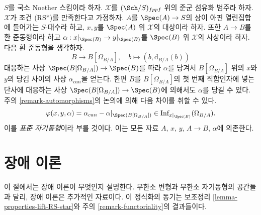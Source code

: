 \begin{remark}[표준 자기동형]
\label{remark-canonical-isomorphism}
$S$를 국소 Noether 스킴이라 하자. $\mathcal{X}$를
$(\Sch/S)_{fppf}$ 위의 준군 섬유화 범주라 하자.
$\mathcal{X}$가 조건 (RS*)를 만족한다고 가정하자.
$A$를 $\Spec(A) \to S$의 상이 아핀 열린집합에 들어가는 $S$-대수라
하고, $x, y$를 $\Spec(A)$ 위 $\mathcal{X}$의 대상이라 하자.
또한 $A \to B$를 환 준동형이라 하고
$\alpha : x|_{\Spec(B)} \to y|_{\Spec(B)}$를 $\Spec(B)$ 위 $\mathcal{X}$의
사상이라 하자. 다음 환 준동형을 생각하자.
$$
B \longrightarrow B[\Omega_{B/A}],
\quad
b \longmapsto (b, \text{d}_{B/A}(b))
$$
대응하는 사상 $\Spec(B[\Omega_{B/A}]) \to \Spec(B)$를 따라 $\alpha$를
당겨서 $B[\Omega_{B/A}]$ 위의 $x$와 $y$의 당김 사이의 사상
$\alpha_{can}$을 얻는다.
한편 $B$를 $B[\Omega_{B/A}]$의 첫 번째 직합인자에 넣는 단사에 대응하는
사상 $\Spec(B[\Omega_{B/A}]) \to \Spec(B)$에 의해서도 $\alpha$를 당길 수
있다. 주의 \ref{remark-automorphisms}의 논의에 의해 다음 차이를 취할 수 있다.
$$
\varphi(x, y, \alpha) = \alpha_{can} - \alpha|_{\Spec(B[\Omega_{B/A}])} \in
\text{Inf}_{x|_{\Spec(B)}}(\Omega_{B/A}).
$$
이를 {\it 표준 자기동형}이라 부를 것이다. 이는 모든 자료
$A$, $x$, $y$, $A \to B$, $\alpha$에 의존한다.
\end{remark}





\section{장애 이론}
\label{section-obstruction-theory}

\noindent
이 절에서는 장애 이론이 무엇인지 설명한다.
무한소 변형과 무한소 자기동형의 공간들과 달리, 장애 이론은 추가적인
자료이다. 이 정식화의 동기는 보조정리
\ref{lemma-properties-lift-RS-star}와 주의 \ref{remark-functoriality}의
결과들이다.

